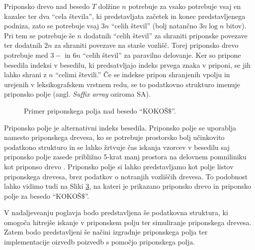 Priponsko drevo nad besedo $T$ dolžine $n$ potrebuje za vsako potrebuje vsaj en kazalec ter dva \enquote{cela števila}, ki predstavljata začetek in konec predstavljenega podniza, zato se potrebuje vsaj $3n$ \enquote{celih števil} (bolj natančno $3n\log{n}$ bitov). Pri tem se potrebuje še $n$ dodatnih \enquote{celih števil} za shraniti priponske povezave ter dodatnih $2n$ za shraniti povezave na starše vozlišč. Torej priponsko drevo potrebuje med $3-$  in $6n$ \enquote{celih števil} za paravilno delovanje. Ker so pripone besedila indeksi v besedilu, ki predsatvljajo indeks prvega znaka v priponi, se jih lahko shrani z $n$ \enquote{celimi števili.} Če se indekse pripon shranjenih vpolju in urejenih v leksikografskem vrstnem redu, se to podatkovno strukturo imenuje priponsko polje (angl. \textit{Suffix array} oziroma SA).

\begin{figure}[htb]
    \begin{subfigure}[t]{\linewidth}
        
        
        \centering
        \subcaption*{}
        \label{fig:aSADrevo}
    \end{subfigure}
    \begin{subfigure}[t]{1\linewidth}        
        
        \centering
        \subcaption*{}
        \label{fig:aSAPolje}
    \end{subfigure}
    \caption{Primer priponskega polja nad besedo \enquote{KOKOŠ$\$$}.} 
    \label{fig:SuffuxArray}
\end{figure}

Priponsko polje je alternativni indeks besedila. Priponsko polje se uporablja namesto priponskega drevesa, ko se potrebuje prostorsko bolj učinkovito podatkono strukturo in se lahko žrtvuje čas iskanja vzorcev v besedilu saj priponsko polje zasede približno 5-krat manj prostora na delovnem pomniliniku kot priponso drevo \cite{Manber1990}. Priponsko polje si lahko predstavljamo kot polje listov priponskega drevesa, brez podatkov o notranjih vozliščih drevesa. To podobnost lahko vidimo tudi na Sliki \ref{fig:SuffuxArray}, na kateri je prikazano priponsko drevo in priponsko polje za besedo \enquote{KOKOŠ$\$$}.



V nadaljeveanju poglavja bodo predstavljena še podatkovna struktura, ki omogoča hitrejše iskanje v priponskem polju ter simuliranje priponskega drevesa. Zatem bodo predstavljeni še načini izgradnje priponskega polja ter implementacije oizvedb poizvedb s pomočjo priponskega polja.

